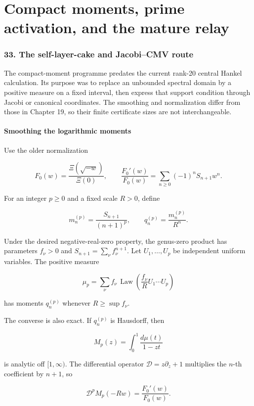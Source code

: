 \documentclass[
  10pt,
  a4paper,
  10pt,
  oneside,
  openany]{book}
\begin{document}
\part{Compact moments, prime activation, and the mature relay}

\section{33. The self-layer-cake and Jacobi--CMV
route}\label{ch-layercake}

The compact-moment programme predates the current rank-20 central Hankel
calculation. Its purpose was to replace an unbounded spectral domain by
a positive measure on a fixed interval, then express that support
condition through Jacobi or canonical coordinates. The smoothing and
normalization differ from those in Chapter 19, so their finite
certificate sizes are not interchangeable.

\subsection{Smoothing the logarithmic
moments}\label{smoothing-the-logarithmic-moments}

Use the older normalization

\[
 F_0(w)=\frac{\Xi(\sqrt{-w})}{\Xi(0)},\qquad
 \frac{F_0'(w)}{F_0(w)}=\sum_{n\ge0}(-1)^nS_{n+1}w^n.
\]

For an integer \(p\ge0\) and a fixed scale \(R>0\), define

\[
 m_n^{(p)}=\frac{S_{n+1}}{(n+1)^p},\qquad
 q_n^{(p)}=\frac{m_n^{(p)}}{R^n}.
 \tag{33.1}\label{eq:33.1}
\]

Under the desired negative-real-zero property, the genus-zero product
has parameters \(f_\nu>0\) and \(S_{n+1}=\sum_\nu f_\nu^{n+1}\). Let
\(U_1,\ldots,U_p\) be independent uniform variables. The positive
measure

\[
 \mu_p=\sum_\nu f_\nu\,
 \operatorname{Law}\!\left(\frac{f_\nu}{R}U_1\cdots U_p\right)
\]

has moments \(q_n^{(p)}\) whenever \(R\ge\sup f_\nu\).

The converse is also exact. If \(q_n^{(p)}\) is Hausdorff, then

\[
 M_p(z)=\int_0^1\frac{d\mu(t)}{1-zt}
\]

is analytic off \([1,\infty)\). The differential operator
\(\mathcal D=z\partial_z+1\) multiplies the \(n\)-th coefficient by
\(n+1\), so

\[
 \mathcal D^pM_p(-Rw)=\frac{F_0'(w)}{F_0(w)}.
 \tag{33.2}\label{eq:33.2}
\]
\end{document}
